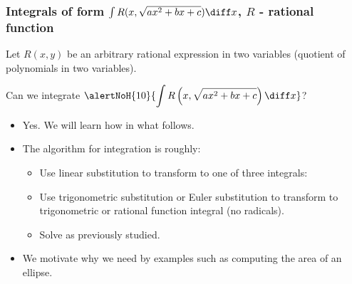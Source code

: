 \begin{frame}
\frametitle{Integrals of form $\int R(x,\sqrt{ax^2+bx+c}) \diff x$, $R$ - rational function}
Let $R(x,y)$ be an arbitrary rational expression in two variables (quotient of polynomials in two variables).
\begin{question}
Can we integrate $\alertNoH{10}{\displaystyle\int R\left(x,\sqrt{ax^2+bx+c} \right) \diff x}$?
\end{question}
\begin{itemize}
\item<2-> Yes. We will learn how in what follows.
\item<3-> The algorithm for integration is roughly:
\begin{itemize}
\item<4-> Use linear substitution to transform to one of three integrals:
  
\item<8-> Use trigonometric substitution or Euler substitution to transform to trigonometric or rational function integral (no radicals).
\item<9-> Solve as previously studied.
\end{itemize}
\item<10-> We motivate why we need  by examples such as computing the area of an ellipse.
\end{itemize}
\end{frame}
